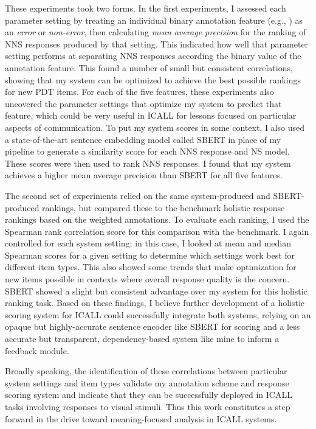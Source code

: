These experiments took two forms. In the first experiments, I assessed each parameter setting by treating an individual binary annotation feature (e.g., ) as an \textit{error} or \textit{non-error}, then calculating \textit{mean average precision} for the ranking of NNS responses produced by that setting. This indicated how well that parameter setting performs at separating NNS responses according the binary value of the annotation feature. This found a number of small but consistent correlations, showing that my system can be optimized to achieve the best possible rankings for new PDT items. For each of the five features, these experiments also uncovered the parameter settings that optimize my system to predict that feature, which could be very useful in ICALL for lessons focused on particular aspects of communication. To put my system scores in some context, I also used a state-of-the-art sentence embedding model called SBERT in place of my pipeline to generate a similarity score for each NNS response and NS model. These scores were then used to rank NNS responses. I found that my system achieves a higher mean average precision than SBERT for all five features.

The second set of experiments relied on the same system-produced and SBERT-produced rankings, but compared these to the benchmark holistic response rankings based on the weighted annotations. To evaluate each ranking, I used the Spearman rank correlation score for this comparison with the benchmark. I again controlled for each system setting; in this case, I looked at mean and median Spearman scores for a given setting to determine which settings work best for different item types. This also showed some trends that make optimization for new items possible in contexts where overall response quality is the concern. SBERT showed a slight but consistent advantage over my system for this holistic ranking task. Based on these findings, I believe further development of a holistic scoring system for ICALL could successfully integrate both systems, relying on an opaque but highly-accurate sentence encoder like SBERT for scoring and a less accurate but transparent, dependency-based system like mine to inform a feedback module.

Broadly speaking, the identification of these correlations between particular system settings and item types validate my annotation scheme and response scoring system and indicate that they can be successfully deployed in ICALL tasks involving responses to visual stimuli. Thus this work constitutes a step forward in the drive toward meaning-focused analysis in ICALL systems.


